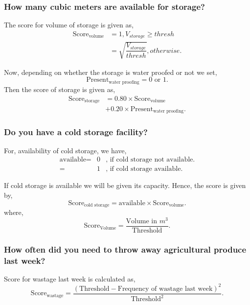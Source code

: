 \documentclass[oneside,twocolumn]{article}
\newcommand{\tsub}[2]{\text{#1}_{\text{#2}}}
\begin{document}
\subsubsection{How many cubic meters are available for storage?}
The score for volume of storage is given as,
\begin{align*}
  \tsub{Score}{volume} &= 1, V_{storage} \ge thresh \\
  &= \sqrt{\dfrac{V_{storage}}{thresh}}, otherwise.
\end{align*}

Now, depending on whether the storage is water proofed or not
we set,
\[
\tsub{Present}{water proofing} = 0 \text{ or } 1.
\]
Then the score of storage is given as,
\begin{align*}
  \tsub{Score}{storage} &= 0.80 \times \tsub{Score}{volume} \\
  &+ 0.20 \times \tsub{Present}{water proofing}.
\end{align*}

\subsubsection{Do you have a cold storage facility?}
For, availability of cold storage, we have,
\begin{align*}
  \text{available} =& 0 &, \text{ if cold storage not available.} \\
  =& 1 &, \text{ if cold storage available.}
\end{align*}

If cold storage is available we will be given its capacity. Hence, the score is given by,
\[
\text{Score}_{\text{cold storage}} = \text{available} \times \text{Score}_{\text{volume}}.
\]
where,
\[
\text{Score}_{\text{Volume}} = \dfrac{\text{Volume in } m^{3}}{\text{Threshold}}.
\]

\subsubsection{How often did you need to throw away agricultural produce last week?}
Score for wastage last week is calculated as,
\[
\text{Score}_{\text{wastage}} = \dfrac{(\text{Threshold} - \text{Frequency of wastage last week})^2}{\text{Threshold}^2}.
\]
\end{document}
